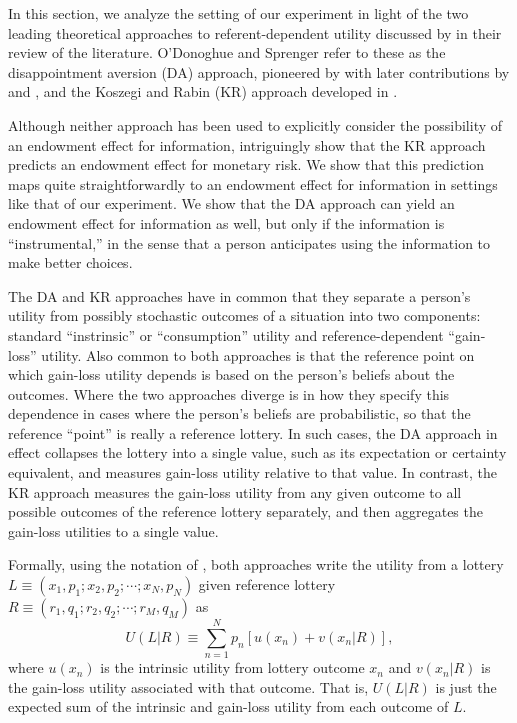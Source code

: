 \documentclass[11pt,reqno]{amsart}
\begin{document}
In this section, we analyze the setting of our experiment in light of the two
leading theoretical approaches to referent-dependent utility discussed by
\citet{odonoghue_sprenger18} in their review of the literature. O'Donoghue and
Sprenger refer to these as the disappointment aversion (DA) approach,
pioneered by \citet{bell85} with later contributions by \citet{loomes_sugden86}
and \citet{gul91}, and the Koszegi and Rabin (KR) approach developed in
\citet{koszegi_rabin06,koszegi_rabin07, koszegi_rabin09}.

Although neither approach has been used to explicitly consider the possibility
of an endowment effect for information, \citet{koszegi_rabin07} intriguingly
show that the KR approach predicts an endowment effect for monetary risk. We
show that this prediction maps quite straightforwardly to an endowment effect
for information in settings like that of our experiment. We show that the DA
approach can yield an endowment effect for information as well, but only if
the information is ``instrumental,'' in the sense that a person anticipates
using the information to make better choices. 

The DA and KR approaches have in common that they separate a person's utility
from possibly stochastic outcomes of a situation into two components: standard
``instrinsic'' or ``consumption'' utility and reference-dependent
``gain-loss'' utility. Also common to both approaches is that the reference
point on which gain-loss utility depends is based on the person's beliefs
about the outcomes. Where the two approaches diverge is in how they specify
this dependence in cases where the person's beliefs are probabilistic, so that
the reference ``point'' is really a reference lottery. In such cases, the DA
approach in effect collapses the lottery into a single value, such as its
expectation or certainty equivalent, and measures gain-loss utility relative
to that value. In contrast, the KR approach measures the gain-loss utility
from any given outcome to all possible outcomes of the reference lottery
separately, and then aggregates the gain-loss utilities to a single value. 

Formally, using the notation of \citet{odonoghue_sprenger18}, both approaches
write the utility from a lottery $L \equiv (x_1,p_1; x_2, p_2; \cdots; x_N,
p_N)$ given reference lottery $R \equiv (r_1, q_1; r_2, q_2; \cdots; r_M,
q_M)$ as
\begin{equation*}
   U(L|R) \equiv \sum_{n=1}^N p_n[u(x_n) + v(x_n|R)],
\end{equation*}
where $u(x_n)$ is the intrinsic utility from lottery outcome $x_n$ and
$v(x_n|R)$ is the gain-loss utility associated with that outcome. That is,
$U(L|R)$ is just the expected sum of the intrinsic and gain-loss utility from
each outcome of $L$. 
\end{document}
